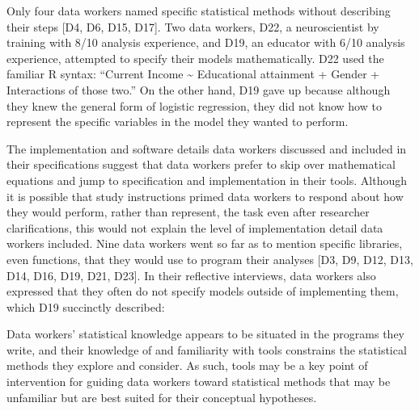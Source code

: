 Only four data workers named specific statistical methods without describing
their steps [D4, D6, D15, D17]. Two data workers, D22, a neuroscientist by
training with 8/10 analysis experience, and D19, an educator with 6/10 analysis
experience, attempted to specify their models mathematically. D22 used the
familiar R syntax: ``Current Income \textasciitilde\xspace Educational attainment + Gender +
Interactions of those two.'' On the other hand, D19 gave up because although
they knew the general form of logistic regression, they did not know how to
represent the specific variables in the model they wanted to perform. 

The implementation and software details data workers discussed and included in
their specifications suggest that data workers prefer to skip over mathematical
equations and jump to specification and implementation in their tools. Although
it is possible that study instructions primed data workers to respond about how
they would perform, rather than represent, the task even after researcher
clarifications, this would not explain the level of implementation detail data
workers included. Nine data workers went so far as to mention specific
libraries, even functions, that they would use to program their analyses [D3,
D9, D12, D13, D14, D16, D19, D21, D23]. In their reflective interviews, data
workers also expressed that they often do not specify models outside of
implementing them, which D19 succinctly described:  


Data workers' statistical knowledge appears to be situated in the programs they
write, and their knowledge of and familiarity with tools constrains the
statistical methods they explore and consider. As such, tools may be a key point
of intervention for guiding data workers toward statistical methods that may be
unfamiliar but are best suited for their conceptual hypotheses.

